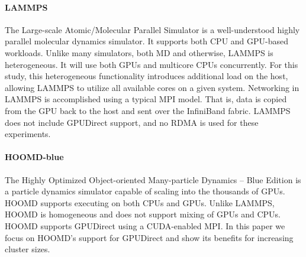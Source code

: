 \paragraph {LAMMPS} The Large-scale Atomic/Molecular Parallel Simulator is a
well-understood highly parallel molecular dynamics simulator.  It supports both
CPU and GPU-based workloads.  Unlike many simulators, both MD and otherwise,
LAMMPS is heterogeneous.  It will use both GPUs and multicore CPUs concurrently.
For this study, this heterogeneous functionality introduces additional load on
the host, allowing LAMMPS to utilize all available cores on a given system.
Networking in LAMMPS is accomplished using a typical MPI model. That is, data is
copied from the GPU back to the host and sent over the InfiniBand fabric.  %
LAMMPS does not include GPUDirect support, and no RDMA is used for these experiments.

\paragraph{HOOMD-blue} The Highly Optimized Object-oriented Many-particle
Dynamics -- Blue Edition is a particle dynamics simulator capable of
scaling into the thousands of GPUs.  HOOMD supports executing on both CPUs and
GPUs.  Unlike LAMMPS, HOOMD is homogeneous and does not support mixing
of GPUs and CPUs.  HOOMD supports GPUDirect using a CUDA-enabled MPI.
In this paper we focus on HOOMD's
support for GPUDirect and show its benefits for increasing cluster sizes.  


